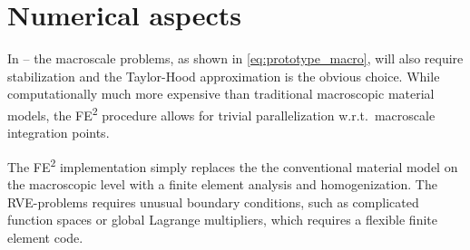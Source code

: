 \documentclass[MikaelDissertation.tex]{subfiles}
\begin{document}
% 
% 

\section{Numerical aspects}

In -- the macroscale problems, as shown in \cref{eq:prototype_macro}, will also require stabilization and the Taylor-Hood approximation is the obvious choice.
While computationally much more expensive than traditional macroscopic material models, the FE\textsuperscript{2} procedure allows for trivial parallelization w.r.t.\ macroscale integration points.

The FE\textsuperscript{2} implementation simply replaces the the conventional material model on the macroscopic level with a finite element analysis and homogenization.
The RVE-problems requires unusual boundary conditions, such as complicated function spaces or global Lagrange multipliers, which requires a flexible finite element code.
\end{document}
